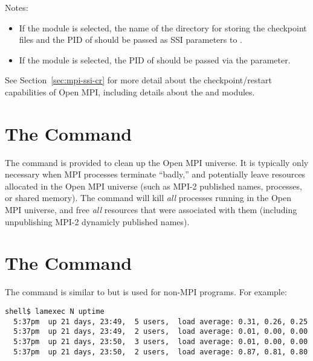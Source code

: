 \noindent Notes:

\begin{itemize}
\item If the   module is selected, the name of
  the directory for storing the checkpoint files and the PID of
   should be passed as SSI parameters to
  .
  
\item If the   module is selected, the PID of
   should be passed via the  parameter.
\end{itemize}


See Section~\ref{sec:mpi-ssi-cr} for more detail about the
checkpoint/restart capabilities of Open MPI, including details about
the  and   modules.


\section{The  Command}
\label{sec:commands-lamclean}

The  command is provided to clean up the Open MPI universe.
It is typically only necessary when MPI processes terminate ``badly,''
and potentially leave resources allocated in the Open MPI universe (such as
MPI-2 published names, processes, or shared memory).  The
 command will kill {\em all} processes running in the
Open MPI universe, and free {\em all} resources that were associated with
them (including unpublishing MPI-2 dynamicly published names).


\section{The  Command}
\label{sec:commands-lamexec}

The  command is similar to  but is used for
non-MPI programs.  For example:

\lstset{style=lam-cmdline}
\begin{lstlisting}
shell$ lamexec N uptime
  5:37pm  up 21 days, 23:49,  5 users,  load average: 0.31, 0.26, 0.25
  5:37pm  up 21 days, 23:49,  2 users,  load average: 0.01, 0.00, 0.00
  5:37pm  up 21 days, 23:50,  3 users,  load average: 0.01, 0.00, 0.00
  5:37pm  up 21 days, 23:50,  2 users,  load average: 0.87, 0.81, 0.80
\end{lstlisting}

